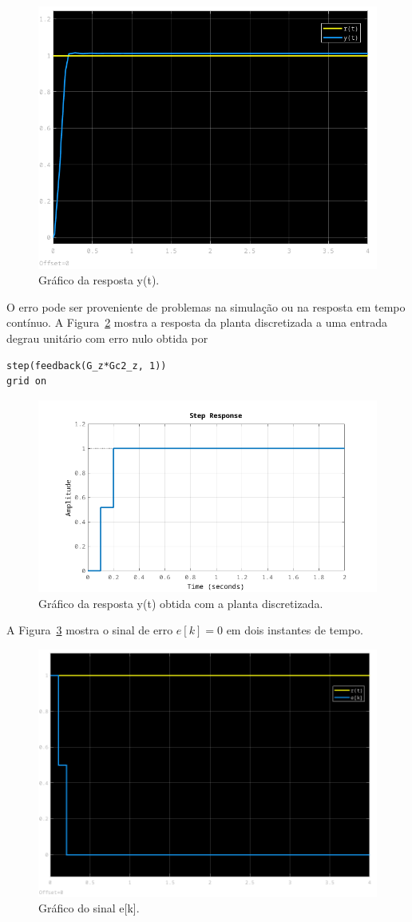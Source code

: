 \documentclass{article}
\begin{document}
        \begin{figure}[H]
           \centering
                \includegraphics[width=.5\linewidth]{images/q4_y_t.png}
                \caption{Gráfico da resposta y(t).}
                \label{fig:q4_simulink_y}
        \end{figure}

        {O erro pode ser proveniente de problemas na simulação ou na
        resposta em tempo contínuo. A Figura~\ref{fig:q4_step} mostra a resposta
        da planta discretizada a uma entrada degrau unitário com erro nulo
        obtida por}
        \begin{lstlisting}
step(feedback(G_z*Gc2_z, 1))
grid on
        \end{lstlisting}

        \begin{figure}[H]
           \centering
                \includegraphics[width=.7\linewidth]{images/q4_step.png}
                \caption{Gráfico da resposta y(t) obtida com a planta discretizada.}
                \label{fig:q4_step}
        \end{figure}

        {A Figura~\ref{fig:q4_simulink_e} mostra o sinal de erro $e[k] = 0$ em
        dois instantes de tempo.}

        \begin{figure}[H]
           \centering
                \includegraphics[width=.6\linewidth]{images/q4_e_k.png}
                \caption{Gráfico do sinal e[k].}
                \label{fig:q4_simulink_e}
        \end{figure}
\end{document}
